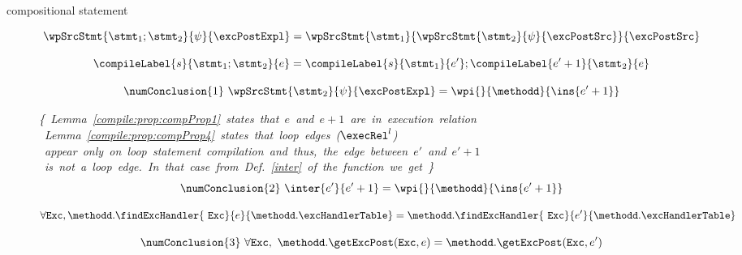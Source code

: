 \begin{description}
       \item[compositional statement]
          
	     $$\wpSrcStmt{  \stmt_1 ;  \stmt_2 }{\psi}{\excPostExpl} = 
	     \wpSrcStmt{\stmt_1 }{\wpSrcStmt{\stmt_2 }{\psi }{ \excPostSrc}} { \excPostSrc} $$
	     
                 $$\compileLabel{s}{ \stmt_1 ;  \stmt_2}{e} =
	                \compileLabel{s}{\stmt_1}{e'};%
			\compileLabel{e'+1}{\stmt_2}{e}  $$
		  

	       $$ \numConclusion{1} \    \wpSrcStmt{  \stmt_2 }{   \psi }{\excPostExpl } = \wpi{}{\methodd}{\ins{e'+1}} $$

	       \mbox{\rm\textit{\{
	       Lemma \ref{compile:prop:compProp1} states that $e$ and $e+1$ are in execution relation}}\\
	      \mbox{\rm\textit{ Lemma \ref{compile:prop:compProp4} states that loop edges ($\execRel^{l}$) }} \\
	       \mbox{\rm\textit{  appear only on loop statement compilation and thus, the edge between  $e'$ and $e' + 1$}}\\
	       \mbox{\rm\textit{ is not a loop edge. In that case from Def. \ref{inter}  of the function \interOnly{} we get \}  }} 
	        $$\numConclusion{2} \ \inter{e'}{e'+1} = \wpi{}{\methodd}{\ins{e'+1}} $$

	         $$ \forall  \mbox{\rm\texttt{Exc}}, \methodd.\findExcHandler{\mbox{ \rm \texttt{Exc}}  }{e}{\methodd.\excHandlerTable} = 
		                                 \methodd.\findExcHandler{\mbox{ \rm \texttt{Exc}}  }{e'}{\methodd.\excHandlerTable}   $$
	       
                $$ \numConclusion{3} \               \forall \mbox{\rm\texttt{Exc}}, \ \methodd.\getExcPost(\mbox{\rm\texttt{Exc}}, e ) =  
                                                                                   \methodd.\getExcPost(\mbox{\rm\texttt{Exc}}, e' ) $$ 
										   

\end{description}
